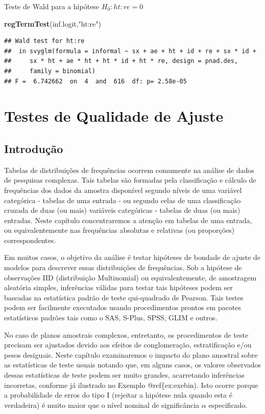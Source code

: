 \documentclass[]{book}
\newenvironment{Shaded}{\begin{snugshade}}{\end{snugshade}}
\newcommand{\KeywordTok}[1]{\textcolor[rgb]{0.13,0.29,0.53}{\textbf{#1}}}
\newcommand{\StringTok}[1]{\textcolor[rgb]{0.31,0.60,0.02}{#1}}
\newcommand{\NormalTok}[1]{#1}
\theoremstyle{definition}
\theoremstyle{definition}
\theoremstyle{definition}
\theoremstyle{remark}
\begin{document}
Teste de Wald para a hipótese \(H_0: ht:re=0\)

\begin{Shaded}
\begin{Highlighting}[]
\KeywordTok{regTermTest}\NormalTok{(inf.logit,}\StringTok{"ht:re"}\NormalTok{)}
\end{Highlighting}
\end{Shaded}

\begin{verbatim}
## Wald test for ht:re
##  in svyglm(formula = informal ~ sx + ae + ht + id + re + sx * id + 
##     sx * ht + ae * ht + ht * id + ht * re, design = pnad.des, 
##     family = binomial)
## F =  6.742662  on  4  and  616  df: p= 2.58e-05
\end{verbatim}

\chapter{Testes de Qualidade de Ajuste}\label{testqualajust}

\section{Introdução}\label{introducao-1}

Tabelas de distribuições de frequências ocorrem comumente na análise de
dados de pesquisas complexas. Tais tabelas são formadas pela
classificação e cálculo de frequências dos dados da amostra disponível
segundo níveis de uma variável categórica - tabelas de uma entrada - ou
segundo celas de uma classificação cruzada de duas (ou mais) variáveis
categóricas - tabelas de duas (ou mais) entradas. Neste capítulo
concentraremos a atenção em tabelas de uma entrada, ou equivalentemente
nas frequências absolutas e relativas (ou proporções) correspondentes.

Em muitos casos, o objetivo da análise é testar hipóteses de bondade de
ajuste de modelos para descrever essas distribuições de frequências. Sob
a hipótese de observações IID (distribuição Multinomial) ou
equivalentemente, de amostragem aleatória simples, inferências válidas
para testar tais hipóteses podem ser baseadas na estatística padrão de
teste qui-quadrado de Pearson. Tais testes podem ser facilmente
executados usando procedimentos prontos em pacotes estatísticos padrões
tais como o SAS, S-Plus, SPSS, GLIM e outros.

No caso de planos amostrais complexos, entretanto, os procedimentos de
teste precisam ser ajustados devido aos efeitos de conglomeração,
estratificação e/ou pesos desiguais. Neste capítulo examinaremos o
impacto do plano amostral sobre as estatísticas de teste usuais notando
que, em alguns casos, os valores observados dessas estatísticas de teste
podem ser muito grandes, acarretando inferências incorretas, conforme já
ilustrado no Exemplo @ref\{ex:exebin). Isto ocorre porque a
probabilidade de erros do tipo I (rejeitar a hipótese nula quando esta é
verdadeira) é muito maior que o nível nominal de significância
\(\alpha\) especificado.
\end{document}
